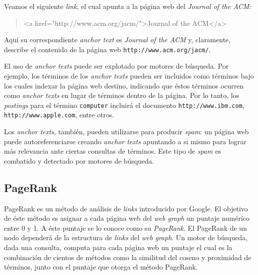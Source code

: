 		
		Veamos el siguiente \textit{link}, el cual apunta a la página web del \textit{Journal of the ACM}:
		\begin{quote}
			\begin{ttfamily}
				<a href="http://www.acm.org/jacm/">Journal of the ACM</a>
			\end{ttfamily}
		\end{quote}
		Aquí su correspondiente \textit{anchor text} es \textit{Journal of the ACM} y, claramente, describe el contenido de la página web \texttt{http://www.acm.org/jacm/}. \par
		
		El uso de \textit{anchor texts} puede ser explotado por motores de búsqueda. Por ejemplo, los términos de los \textit{anchor texts} pueden ser incluidos como términos bajo los cuales indexar la página web destino, indicando que éstos términos ocurren como \textit{anchor texts} en lugar de términos dentro de la página. Por lo tanto, los \textit{postings} para el término \texttt{computer} incluirá el documento \texttt{http://www.ibm.com}, \texttt{http://www.apple.com}, entre otros. \par
		
		Los \textit{anchor texts}, también, pueden utilizarse para producir \textit{spam}: un página web puede autoreferenciarse creando \textit{anchor texts} apuntando a si mismo para lograr más relevancia ante ciertas consultas de términos. Este tipo de \textit{spam} es combatido y detectado por motores de búsqueda.
		
	\subsection{PageRank}
		PageRank es un método de análisis de \textit{links} introducido por Google. El objetivo de éste método es asignar a cada página web del \textit{web graph} un puntaje numérico entre 0 y 1. A éste puntaje se lo conoce como su \textit{PageRank}. El PageRank de un nodo dependerá de la estructura de \textit{links} del \textit{web graph}. Un motor de búsqueda, dada una consulta, computa para cada página web un puntaje el cual es la combinación de cientos de métodos como la similitud del coseno y proximidad de términos, junto con el puntaje que otorga el método PageRank. \par
		
